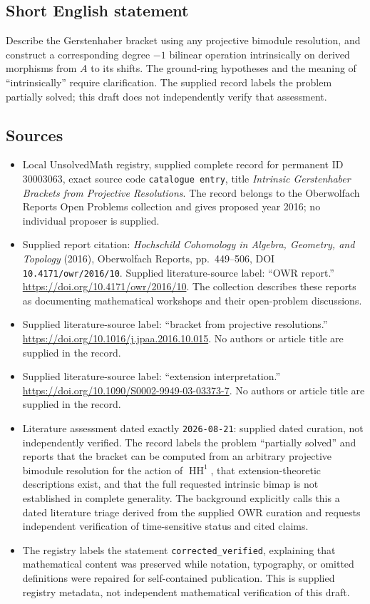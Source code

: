 \documentclass[11pt]{article}
\begin{document}
\subsection{Short English statement}
Describe the Gerstenhaber bracket using any projective bimodule resolution, and construct a corresponding degree \(-1\) bilinear operation intrinsically on derived morphisms from \(A\) to its shifts. The ground-ring hypotheses and the meaning of ``intrinsically'' require clarification. The supplied record labels the problem partially solved; this draft does not independently verify that assessment.
\subsection{Sources}
\begin{itemize}
\item Local UnsolvedMath registry, supplied complete record for permanent ID \(30003063\), exact source code \texttt{catalogue entry}, title \emph{Intrinsic Gerstenhaber Brackets from Projective Resolutions}. The record belongs to the Oberwolfach Reports Open Problems collection and gives proposed year 2016; no individual proposer is supplied.
\item Supplied report citation: \emph{Hochschild Cohomology in Algebra, Geometry, and Topology} (2016), Oberwolfach Reports, pp.~449--506, DOI \texttt{10.4171/owr/2016/10}. Supplied literature-source label: ``OWR report.'' \url{https://doi.org/10.4171/owr/2016/10}. The collection describes these reports as documenting mathematical workshops and their open-problem discussions.
\item Supplied literature-source label: ``bracket from projective resolutions.'' \url{https://doi.org/10.1016/j.jpaa.2016.10.015}. No authors or article title are supplied in the record.
\item Supplied literature-source label: ``extension interpretation.'' \url{https://doi.org/10.1090/S0002-9949-03-03373-7}. No authors or article title are supplied in the record.
\item Literature assessment dated exactly \texttt{2026-08-21}: supplied dated curation, not independently verified. The record labels the problem ``partially solved'' and reports that the bracket can be computed from an arbitrary projective bimodule resolution for the action of \(\operatorname{HH}^1\), that extension-theoretic descriptions exist, and that the full requested intrinsic bimap is not established in complete generality. The background explicitly calls this a dated literature triage derived from the supplied OWR curation and requests independent verification of time-sensitive status and cited claims.
\item The registry labels the statement \texttt{corrected\_verified}, explaining that mathematical content was preserved while notation, typography, or omitted definitions were repaired for self-contained publication. This is supplied registry metadata, not independent mathematical verification of this draft.
\end{itemize}
\end{document}
